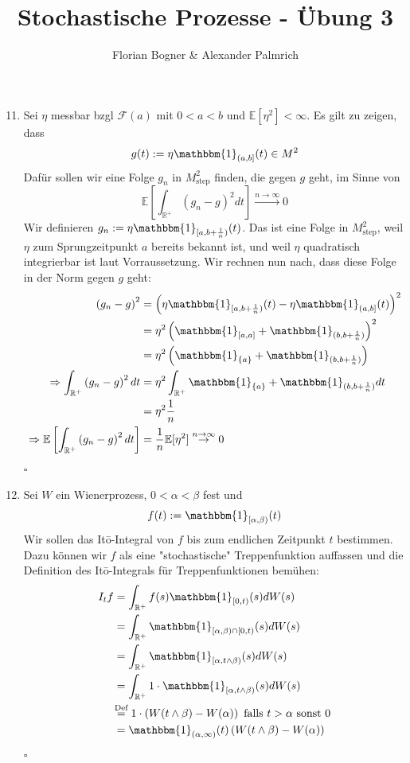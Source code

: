 \documentclass[a4paper,11pt,notitlepage,fullpage]{article}
\newcommand{\E}{\mathbb E}
\newcommand{\ind}{\mathbbm{1}}
\begin{document}
\author{Florian Bogner \& Alexander Palmrich}
\title{Stochastische Prozesse - Übung 3}
\maketitle

\begin{enumerate}
\setcounter{enumi}{10}

\item Sei $\eta$ messbar bzgl $\mathcal{F}(a)$ mit $0<a<b$ und $\E[\eta^2]<\infty$.
Es gilt zu zeigen, dass
$$g(t):=\eta \ind_{(a,b]}(t) \in M^2$$
Dafür sollen wir eine Folge $g_n$ in $M^2_\text{step}$ finden, die gegen $g$ geht, im Sinne von
$$\E\left[\int_{\mathbb{R}^+} (g_n-g)^2 dt\right] \stackrel{n\rightarrow\infty}{\rightarrow} 0$$
Wir definieren $g_n := \eta \ind_{[a,b+\frac{1}{n})}(t)$. Das ist eine Folge in $M^2_\text{step}$, weil $\eta$ zum Sprungzeitpunkt $a$ bereits bekannt ist, und weil $\eta$ quadratisch integrierbar ist laut Vorraussetzung. Wir rechnen nun nach, dass diese  Folge in der Norm gegen $g$ geht:
\begin{align*}
\left(g_n-g\right)^2 &= \left(\eta \ind_{[a,b+\frac{1}{n})}(t) - \eta \ind_{(a,b]}(t) \right)^2\\
&= \eta^2 \left(\ind_{[a,a]} + \ind_{(b,b+\frac{1}{n})}\right)^2\\
&= \eta^2 \left(\ind_{\{a\}} + \ind_{(b,b+\frac{1}{n})}\right)\\
\Rightarrow \int_{\mathbb{R}^+} \left(g_n-g\right)^2 dt &= \eta^2 \int_{\mathbb{R}^+}\ind_{\{a\}} + \ind_{(b,b+\frac{1}{n})} dt\\
&= \eta^2 \frac{1}{n}\\
\Rightarrow \E \left[\int_{\mathbb{R}^+} \left(g_n-g\right)^2 dt\right] &= \frac{1}{n}\E[\eta^2] \stackrel{n\rightarrow\infty}{\rightarrow} 0
\end{align*}
\hfill $\square$

\item Sei $W$ ein Wienerprozess, $0<\alpha <\beta$ fest und
$$f(t):= \ind_{[\alpha, \beta)}(t)$$
Wir sollen das Itō-Integral von $f$ bis zum endlichen Zeitpunkt $t$ bestimmen.
Dazu können wir $f$ als eine "stochastische" Treppenfunktion auffassen und die Definition des Itō-Integrals für Treppenfunktionen bemühen:
\begin{align*}
I_t f &= \int_{\mathbb{R}^+} f(s) \ind_{[0,t)}(s) dW(s)\\
&= \int_{\mathbb{R}^+} \ind_{[\alpha, \beta) \cap [0,t)}(s) dW(s)\\
&= \int_{\mathbb{R}^+} \ind_{[\alpha, t\wedge\beta)}(s) dW(s)\\
&= \int_{\mathbb{R}^+} 1\cdot \ind_{[\alpha, t\wedge\beta)}(s) dW(s)\\
&\hspace{-0.2em}\stackrel{\text{Def}}{=} 1\cdot \left( W(t\wedge\beta) - W(\alpha) \right) \text{ falls } t>\alpha \text{ sonst } 0\\
&= \ind_{(\alpha, \infty)}(t) \left( W(t\wedge\beta) - W(\alpha) \right)
\end{align*}
\hfill $\square$


\end{enumerate}
\end{document}
